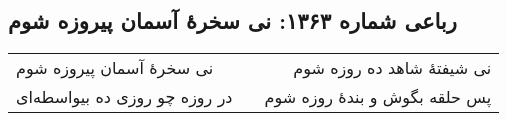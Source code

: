 \begin{center}
\section*{رباعی شماره ۱۳۶۳: نی سخرهٔ آسمان پیروزه شوم}
\label{sec:1363}
\begin{longtable}{l p{0.5cm} r}
نی سخرهٔ آسمان پیروزه شوم
&&
نی شیفتهٔ شاهد ده روزه شوم
\\
در روزه چو روزی ده بیواسطه‌ای
&&
پس حلقه بگوش و بندهٔ روزه شوم
\\
\end{longtable}
\end{center}

